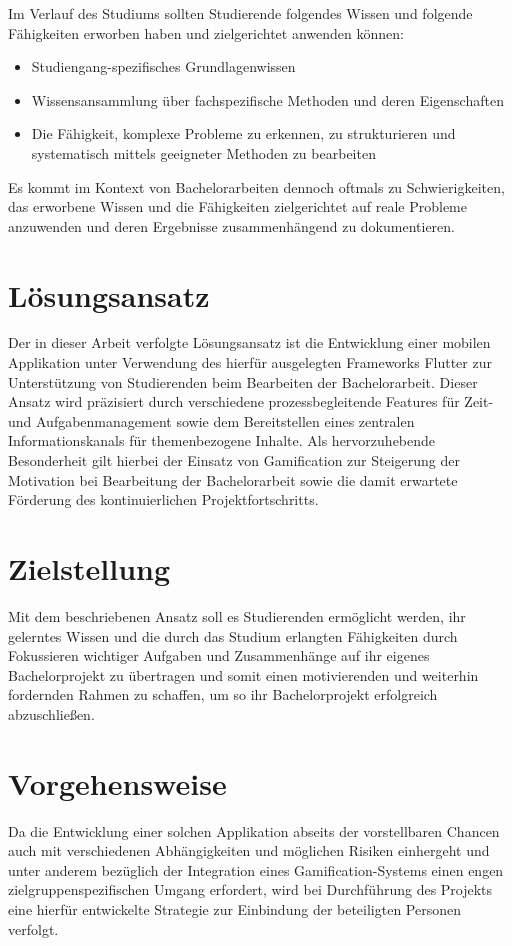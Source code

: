 \documentclass[bibliography=totoc,listof=totoc,BCOR=5mm,DIV=12,oneside]{scrbook}
\begin{document}
\par Im Verlauf des Studiums sollten Studierende folgendes Wissen und folgende Fähigkeiten erworben haben und zielgerichtet anwenden können:
\begin{itemize}
\item Studiengang-spezifisches Grundlagenwissen
\item Wissensansammlung über fachspezifische Methoden und deren Eigenschaften
\item Die Fähigkeit, komplexe Probleme zu erkennen, zu strukturieren und systematisch mittels geeigneter Methoden zu bearbeiten
\end{itemize}

\par Es kommt im Kontext von Bachelorarbeiten dennoch oftmals zu Schwierigkeiten, das erworbene Wissen und die Fähigkeiten zielgerichtet auf reale Probleme anzuwenden und deren Ergebnisse zusammenhängend zu dokumentieren. 

\section{Lösungsansatz}
\par Der in dieser Arbeit verfolgte Lösungsansatz ist die Entwicklung einer mobilen Applikation unter Verwendung des hierfür ausgelegten Frameworks Flutter zur Unterstützung von Studierenden beim Bearbeiten der Bachelorarbeit. Dieser Ansatz wird präzisiert durch verschiedene prozessbegleitende Features für Zeit- und Aufgabenmanagement sowie dem Bereitstellen eines zentralen Informationskanals für themenbezogene Inhalte. Als hervorzuhebende Besonderheit gilt hierbei der Einsatz von Gamification zur Steigerung der Motivation bei Bearbeitung der Bachelorarbeit sowie die damit erwartete Förderung des kontinuierlichen Projektfortschritts.

\section{Zielstellung}
\par \bigskip Mit dem beschriebenen Ansatz soll es Studierenden ermöglicht werden, ihr gelerntes Wissen und die durch das Studium erlangten Fähigkeiten durch Fokussieren wichtiger Aufgaben und Zusammenhänge auf ihr eigenes Bachelorprojekt zu übertragen und somit einen motivierenden und weiterhin fordernden Rahmen zu schaffen, um so ihr Bachelorprojekt erfolgreich abzuschließen.

\section{Vorgehensweise}
\par Da die Entwicklung einer solchen Applikation abseits der vorstellbaren Chancen auch mit verschiedenen Abhängigkeiten und möglichen Risiken einhergeht und unter anderem bezüglich der Integration eines Gamification-Systems einen engen zielgruppenspezifischen Umgang erfordert, wird bei Durchführung des Projekts eine hierfür entwickelte Strategie zur Einbindung der beteiligten Personen verfolgt.
\end{document}

